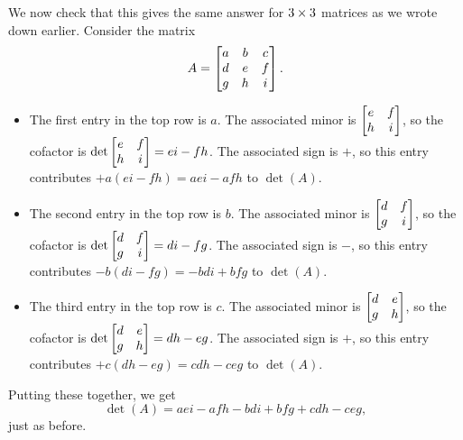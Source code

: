 \documentclass[a4paper]{book}
\theoremstyle{definition}
\begin{document}
We now check that this gives the same answer for $3\times 3$ matrices as
we wrote down earlier.  Consider the matrix
\[ A = \begin{bmatrix} a&b&c \\ d&e&f \\ g&h&i \end{bmatrix}. \]
\begin{itemize}
 \item The first entry in the top row is $a$.  The associated minor is
  $\begin{bmatrix} e&f\\ h&i\end{bmatrix}$, so the cofactor is
  $\det\begin{bmatrix} e&f\\ h&i\end{bmatrix}=ei-fh$.  The associated sign is $+$, so this
  entry contributes $+a(ei-fh)=aei-afh$ to $\det(A)$.
 \item The second entry in the top row is $b$.  The associated minor is
  $\begin{bmatrix} d&f\\ g&i\end{bmatrix}$, so the cofactor is
  $\det\begin{bmatrix} d&f\\ g&i\end{bmatrix}=di-fg$.  The associated sign is $-$, so this
  entry contributes $-b(di-fg)=-bdi+bfg$ to $\det(A)$.
 \item The third entry in the top row is $c$.  The associated minor is
  $\begin{bmatrix} d&e\\ g&h\end{bmatrix}$, so the cofactor is
  $\det\begin{bmatrix} d&e\\ g&h\end{bmatrix}=dh-eg$.  The associated sign is $+$, so this
  entry contributes $+c(dh-eg)=cdh-ceg$ to $\det(A)$.
\end{itemize}
Putting these together, we get
\[ \det(A)=aei-afh-bdi+bfg+cdh-ceg, \]
just as before.
\end{document}
